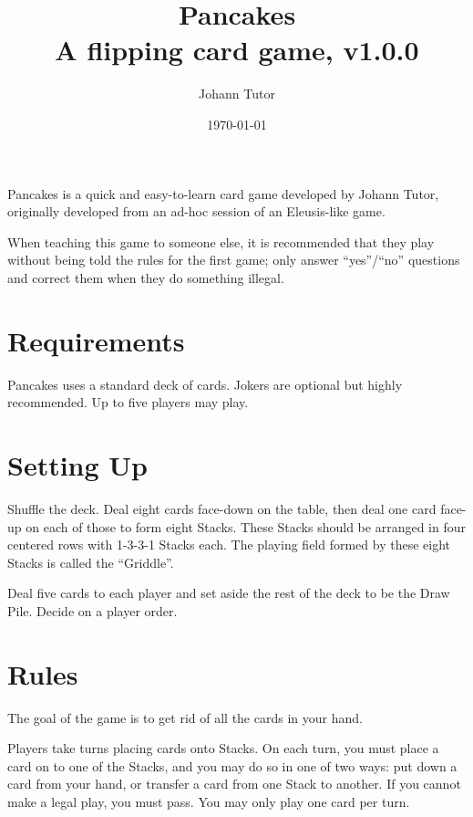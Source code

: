 \documentclass{article}
\newcommand\theversion{1.0.0}
\begin{document}
\title{Pancakes\\ \large A flipping card game, v\theversion}
\author{Johann Tutor}
\date{\today}
\maketitle

Pancakes is a quick and easy-to-learn card game developed by Johann Tutor, originally developed from an ad-hoc session of an Eleusis-like game.

When teaching this game to someone else, it is recommended that they play without being told the rules for the first game;
only answer ``yes''/``no'' questions and correct them when they do something illegal.

\tableofcontents

\newpage

\section{Requirements}

Pancakes uses a standard deck of cards. Jokers are optional but highly recommended.
Up to five players may play.

\section{Setting Up}
\label{sec:setup}

Shuffle the deck. Deal eight cards face-down on the table, then deal one card face-up on each of those to form eight Stacks.
These Stacks should be arranged in four centered rows with 1-3-3-1 Stacks each.
The playing field formed by these eight Stacks is called the ``Griddle''.

Deal five cards to each player and set aside the rest of the deck to be the Draw Pile. Decide on a player order.

\section{Rules}
\label{sec:rules}

The goal of the game is to get rid of all the cards in your hand.

Players take turns placing cards onto Stacks. On each turn, you must place a card on to one of the Stacks, and you may do so in one of two ways: put down a card from your hand, or transfer a card from one Stack to another. If you cannot make a legal play, you must pass. You may only play one card per turn.
\end{document}
